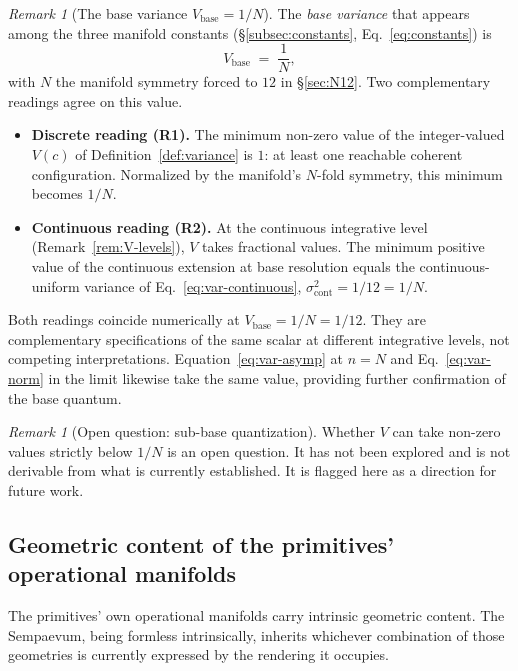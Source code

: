 \documentclass[11pt,a4paper]{article}
\theoremstyle{definition}
\theoremstyle{remark}
\newtheorem{remark}[theorem]{Remark}
\begin{document}
\begin{remark}[The base variance $V_{\text{base}} = 1/N$]\label{rem:V-base}
The \emph{base variance} that appears among the three manifold constants (\S\ref{subsec:constants}, Eq.~\eqref{eq:constants}) is
\[
V_{\text{base}} \;=\; \frac{1}{N},
\]
with $N$ the manifold symmetry forced to $12$ in \S\ref{sec:N12}. Two complementary readings agree on this value.

\begin{itemize}[leftmargin=*]
\item \textbf{Discrete reading (R1).} The minimum non-zero value of the integer-valued $V(c)$ of Definition~\ref{def:variance} is $1$: at least one reachable coherent configuration. Normalized by the manifold's $N$-fold symmetry, this minimum becomes $1/N$.

\item \textbf{Continuous reading (R2).} At the continuous integrative level (Remark~\ref{rem:V-levels}), $V$ takes fractional values. The minimum positive value of the continuous extension at base resolution equals the continuous-uniform variance of Eq.~\eqref{eq:var-continuous}, $\sigma^{2}_{\text{cont}} = 1/12 = 1/N$.
\end{itemize}

Both readings coincide numerically at $V_{\text{base}} = 1/N = 1/12$. They are complementary specifications of the same scalar at different integrative levels, not competing interpretations. Equation~\eqref{eq:var-asymp} at $n=N$ and Eq.~\eqref{eq:var-norm} in the limit likewise take the same value, providing further confirmation of the base quantum.
\end{remark}

\begin{remark}[Open question: sub-base quantization]\label{rem:subbase-open}
Whether $V$ can take non-zero values strictly below $1/N$ is an open question. It has not been explored and is not derivable from what is currently established. It is flagged here as a direction for future work.
\end{remark}

\subsection{Geometric content of the primitives' operational manifolds}\label{subsec:geometries}

The primitives' own operational manifolds carry intrinsic geometric content. The Sempaevum, being formless intrinsically, inherits whichever combination of those geometries is currently expressed by the rendering it occupies.
\end{document}
